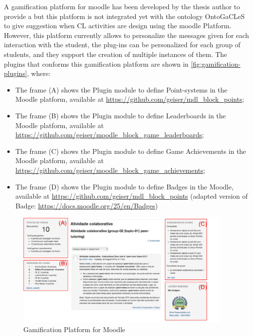 A gamification platform for moodle has been developed by the thesis author to provide a  but this platform is not integrated yet with the ontology OntoGaCLeS to give suggestion when CL activities are design using the moodle Platform.
However, this platform currently allows to personalize the messages given for each interaction with the student, the plug-ins can be personalized for each group of students, and they support the creation of multiple instances of them.
The plugins that conforms this gamification platform are shown in \autoref{fig:gamification-plugins}, where:
\begin{itemize}
 \item The frame (A) shows the Plugin module to define Point-systems in the Moodle platform, available at \url{https://github.com/geiser/mdl_block_points};
 \item The frame (B) shows the Plugin module to define Leaderboards in the Moodle platform, available at \url{https://github.com/geiser/moodle_block_game_leaderboards};
 \item The frame (C) shows the Plugin module to define Game Achievements in the Moodle platform, available at \url{https://github.com/geiser/moodle_block_game_achievements};
 \item The frame (D) shows the Plugin module to define Badges in the Moodle, available at \url{https://github.com/geiser/mdl_block_points} (adapted version of Badge: \url{https://docs.moodle.org/25/en/Badges})
\end{itemize}

 \begin{figure}[htb]
 \caption{Gamification Platform for Moodle}
 \label{fig:gamification-plugins}
 \centering
 \includegraphics[width=0.95\textwidth]{images/chap-mechanisms-procedures/gamification-plugins.png}
 \fautor
 \end{figure}


